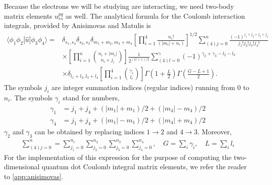 Because the electrons we will be studying are interacting, we need
two-body matrix elements $u^{pq}_{rs}$
as well. The analytical formula for the Coulomb interaction integrals, provided by Anisimovas and 
Matulis \cite{anisimovas1998energy} is
\begin{equation}
    \begin{aligned}
        \langle \phi_1\phi_2| \hat{u} | \phi_3\phi_4 \rangle =& 
        \delta_{s_1, s_4} \delta_{s_2, s_3} \delta_{m_1 + m_2, m_3 + m_4}
        \left[\prod_{i=1}^4 \frac{n_i!}{(|m_i| + n_i)} \right]^{1/2}
        \sum_{(4)j=0}^n \frac{(-1)^{j_1+j_2+j_3+j_4}}{j_1!j_2!j_3!j_4!} \\
        &\times \left[\prod_{i=1}^n \binom{n_i + |m_i|} {n_i + j_i} \right]
        \frac{1}{2^{(G+1)/2}} \sum_{(4)l=0}^\gamma (-1)^{\gamma_2 + \gamma_3 - l_2 - l_3} \\
        &\times \delta_{l_1 + l_2, l_3 + l_4} \left[\prod_{i=1}^4 \binom{\gamma_i}{l_i} \right] 
        \Gamma\left(1 + \frac{L}{2} \right)\Gamma\left(\frac{G - L + 1}{2}\right).
    \end{aligned}
\end{equation}
The symbols $j_i$ are integer summation indices (regular indices) running from $0$ to $n_i$.
The symbols $\gamma_i$ stand for numbers,
\begin{align*}
\gamma_1 &= j_1 + j_4 + (|m_1| + m_1)/2 + (|m_4| - m_4)/2 \\
\gamma_4 &= j_1 + j_4 + (|m_1| - m_1)/2 + (|m_4| + m_4)/2
\end{align*}
$\gamma_2$ and $\gamma_3$ can be obtained by replacing indices $1 \to 2$ and $4 \to 3$.
Moreover,
\begin{align*}
\sum_{(4)j=0}^n =
\sum_{j_1=0}^{n_1}\sum_{j_2=0}^{n_2}\sum_{j_3=0}^{n_3}\sum_{j_4=0}^{n_4},
\quad 
G = \sum_i \gamma_i, 
\quad
L = \sum_i l_i
\end{align*}
For the implementation of this expression for the purpose of computing the two-dimensional 
quantum dot Coulomb integral matrix elements, we refer the reader to \autoref{app:anisimovas}.

